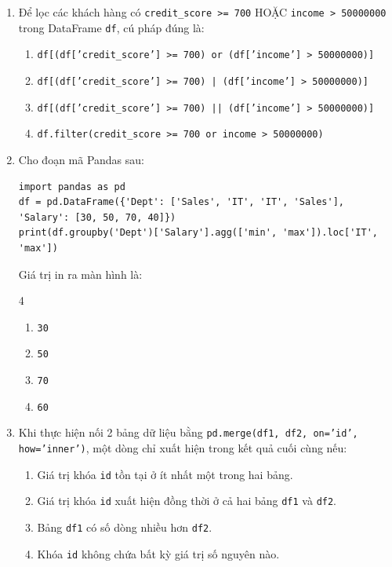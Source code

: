 \documentclass[11pt,a4paper]{article}
\begin{document}
\newpage
\begin{enumerate}[leftmargin=*,itemsep=2.5pt,resume]

\item Để lọc các khách hàng có \texttt{credit\_score >= 700} HOẶC \texttt{income > 50000000} trong DataFrame \texttt{df}, cú pháp đúng là:
\begin{enumerate}[label=\Alph*.]
  \item \texttt{df[(df['credit\_score'] >= 700) or (df['income'] > 50000000)]}
  \item \texttt{df[(df['credit\_score'] >= 700) | (df['income'] > 50000000)]}
  \item \texttt{df[(df['credit\_score'] >= 700) || (df['income'] > 50000000)]}
  \item \texttt{df.filter(credit\_score >= 700 or income > 50000000)}
\end{enumerate}

\item Cho đoạn mã Pandas sau:
\begin{lstlisting}
import pandas as pd
df = pd.DataFrame({'Dept': ['Sales', 'IT', 'IT', 'Sales'], 'Salary': [30, 50, 70, 40]})
print(df.groupby('Dept')['Salary'].agg(['min', 'max']).loc['IT', 'max'])
\end{lstlisting}
Giá trị in ra màn hình là:
\begin{multicols}{4}
\begin{enumerate}[label=\Alph*.]
  \item \texttt{30}
  \item \texttt{50}
  \item \texttt{70}
  \item \texttt{60}
\end{enumerate}
\end{multicols}

\item Khi thực hiện nối 2 bảng dữ liệu bằng \texttt{pd.merge(df1, df2, on='id', how='inner')}, một dòng chỉ xuất hiện trong kết quả cuối cùng nếu:
\begin{enumerate}[label=\Alph*.]
  \item Giá trị khóa \texttt{id} tồn tại ở ít nhất một trong hai bảng.
  \item Giá trị khóa \texttt{id} xuất hiện đồng thời ở cả hai bảng \texttt{df1} và \texttt{df2}.
  \item Bảng \texttt{df1} có số dòng nhiều hơn \texttt{df2}.
  \item Khóa \texttt{id} không chứa bất kỳ giá trị số nguyên nào.
\end{enumerate}


\end{enumerate}
\end{document}
